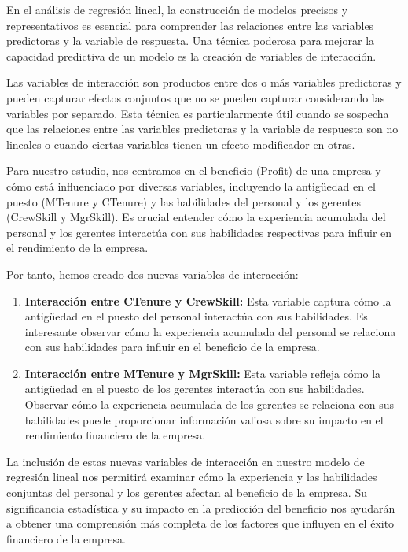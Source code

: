 \documentclass[
]{article}
\begin{document}
En el análisis de regresión lineal, la construcción de modelos precisos
y representativos es esencial para comprender las relaciones entre las
variables predictoras y la variable de respuesta. Una técnica poderosa
para mejorar la capacidad predictiva de un modelo es la creación de
variables de interacción.

Las variables de interacción son productos entre dos o más variables
predictoras y pueden capturar efectos conjuntos que no se pueden
capturar considerando las variables por separado. Esta técnica es
particularmente útil cuando se sospecha que las relaciones entre las
variables predictoras y la variable de respuesta son no lineales o
cuando ciertas variables tienen un efecto modificador en otras.

Para nuestro estudio, nos centramos en el beneficio (Profit) de una
empresa y cómo está influenciado por diversas variables, incluyendo la
antigüedad en el puesto (MTenure y CTenure) y las habilidades del
personal y los gerentes (CrewSkill y MgrSkill). Es crucial entender cómo
la experiencia acumulada del personal y los gerentes interactúa con sus
habilidades respectivas para influir en el rendimiento de la empresa.

Por tanto, hemos creado dos nuevas variables de interacción:

\begin{enumerate}
\def\labelenumi{\arabic{enumi}.}
\item
  \textbf{Interacción entre CTenure y CrewSkill:} Esta variable captura
  cómo la antigüedad en el puesto del personal interactúa con sus
  habilidades. Es interesante observar cómo la experiencia acumulada del
  personal se relaciona con sus habilidades para influir en el beneficio
  de la empresa.
\item
  \textbf{Interacción entre MTenure y MgrSkill:} Esta variable refleja
  cómo la antigüedad en el puesto de los gerentes interactúa con sus
  habilidades. Observar cómo la experiencia acumulada de los gerentes se
  relaciona con sus habilidades puede proporcionar información valiosa
  sobre su impacto en el rendimiento financiero de la empresa.
\end{enumerate}

La inclusión de estas nuevas variables de interacción en nuestro modelo
de regresión lineal nos permitirá examinar cómo la experiencia y las
habilidades conjuntas del personal y los gerentes afectan al beneficio
de la empresa. Su significancia estadística y su impacto en la
predicción del beneficio nos ayudarán a obtener una comprensión más
completa de los factores que influyen en el éxito financiero de la
empresa.
\end{document}
